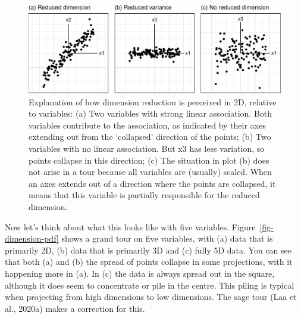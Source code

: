 \documentclass[
  letterpaper,
]{krantz}
\begin{document}
\begin{figure}

{\centering \includegraphics[width=1\textwidth,height=\textheight]{3-intro-dimred_files/figure-pdf/fig-2D-1.pdf}

}

\caption{\label{fig-2D}Explanation of how dimension reduction is
perceived in 2D, relative to variables: (a) Two variables with strong
linear association. Both variables contribute to the association, as
indicated by their axes extending out from the `collapsed' direction of
the points; (b) Two variables with no linear association. But x3 has
less variation, so points collapse in this direction; (c) The situation
in plot (b) does not arise in a tour because all variables are (usually)
scaled. When an axes extends out of a direction where the points are
collapsed, it means that this variable is partially responsible for the
reduced dimension.}

\end{figure}

Now let's think about what this looks like with five variables.
Figure~\ref{fig-dimension-pdf} shows a grand tour on five variables,
with (a) data that is primarily 2D, (b) data that is primarily 3D and
(c) fully 5D data. You can see that both (a) and (b) the spread of
points collapse in some projections, with it happening more in (a). In
(c) the data is always spread out in the square, although it does seem
to concentrate or pile in the centre. This piling is typical when
projecting from high dimensions to low dimensions. The sage tour (Laa et
al., 2020a) makes a correction for this.
\end{document}
